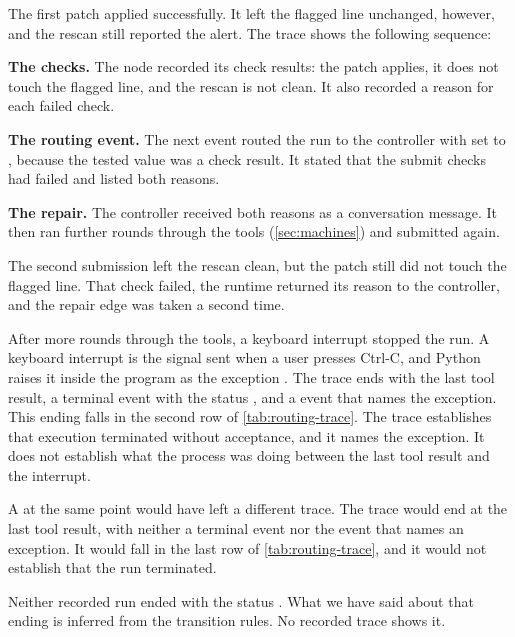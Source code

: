 The first patch applied successfully. It left the flagged line unchanged, however, and the rescan
still reported the alert. The trace shows the following sequence:
\bi
\item \textbf{The checks.} The  node recorded its check results: the patch applies,
it does not touch the flagged line, and the rescan is not clean. It also recorded a reason for each
failed check.
\item \textbf{The routing event.} The next event routed the run to the controller with
 set to , because the tested value was a check result. It stated that
the submit checks had failed and listed both reasons.
\item \textbf{The repair.} The controller received both reasons as a conversation message. It then
ran further rounds through the tools (\cref{sec:machines}) and submitted again.
\ei

The second submission left the rescan clean, but the patch still did not touch the flagged line.
That check failed, the runtime returned its reason to the controller, and the repair edge was taken
a second time.

After more rounds through the tools, a keyboard interrupt stopped the run. A keyboard interrupt is
the signal sent when a user presses Ctrl-C, and Python raises it inside the program as the exception
. The trace ends with the last tool result, a terminal event with the
status , and a  event that names the exception. This ending falls in the second row of
\cref{tab:routing-trace}. The trace establishes that execution terminated without acceptance, and it
names the exception. It does not establish what the process was doing between the last tool result
and the interrupt.

A  at the same point would have left a different trace. The trace would end at the
last tool result, with neither a terminal event nor the event that names an exception. It would fall in the last
row of \cref{tab:routing-trace}, and it would not establish that the run terminated.

Neither recorded run ended with the status . What we have said about that
ending is inferred from the transition rules. No recorded trace shows it.

